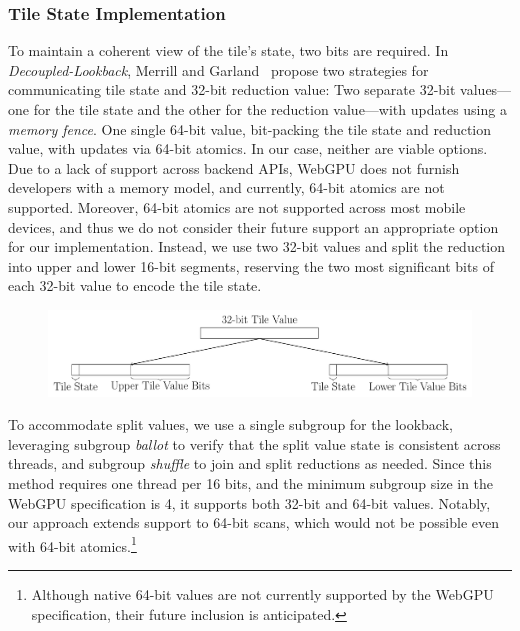 \documentclass[sigconf]{acmart}
\begin{document}
\subsubsection{Tile State Implementation}
To maintain a coherent view of the tile's state, two bits are required. In \emph{Decoupled-Lookback}, Merrill and Garland~\cite{Merrill2016} propose two strategies for communicating tile state and 32-bit reduction value: Two separate 32-bit values---one for the tile state and the other for the reduction value---with updates using a \emph{memory fence}. One single 64-bit value, bit-packing the tile state and reduction value, with updates via 64-bit atomics.
In our case, neither are viable options. Due to a lack of support across backend APIs, WebGPU does not furnish developers with a memory model, and currently, 64-bit atomics are not supported. Moreover, 64-bit atomics are not supported across most mobile devices, and thus we do not consider their future support an appropriate option for our implementation. Instead, we use two 32-bit values and split the reduction into upper and lower 16-bit segments, reserving the two most significant bits of each 32-bit value to encode the tile state.
\begin{figure}[h!]
  \centering
  \includegraphics[width=\linewidth]{graphics/split.pdf}
\end{figure}
To accommodate split values, we use a single subgroup for the lookback, leveraging subgroup \emph{ballot} to verify that the split value state is consistent across threads, and subgroup \emph{shuffle} to join and split reductions as needed. Since this method requires one thread per 16 bits, and the minimum subgroup size in the WebGPU specification is 4, it supports both 32-bit and 64-bit values. Notably, our approach extends support to 64-bit scans, which would not be possible even with 64-bit atomics.\footnote{Although native 64-bit values are not currently supported by the WebGPU specification, their future inclusion is anticipated.}
\end{document}
